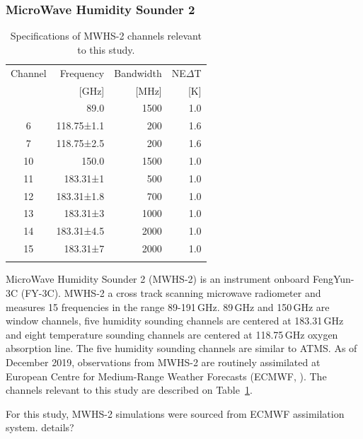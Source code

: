 \documentclass[amt, manuscript]{copernicus}
\newcommand{\todo}[1]{{\color{red} #1}}
\begin{document}
\subsubsection{ MicroWave Humidity Sounder 2}
%
\begin{table}[t]
	\caption{Specifications of MWHS-2 channels relevant to this study.}
	\label{tab:specifications_MWHS2}	
	\begin{tabular}{crrr}
		\tophline
		Channel & Frequency 	& Bandwidth & NE$\Delta$T \\
		& [GHz]			& [MHz]		& [K]		\\
		\middlehline
		1	&	89.0   		  & 1500			&	1.0	\\
		6	&	118.75±1.1    & \phantom{0}200 	&	1.6\\
		7	&	118.75±2.5    & \phantom{0}200 	&	1.6\\
		10	&	150.0         & 1500 			&	1.0 \\
		11	&	183.31±1      & \phantom{0}500  &	1.0 \\
		12  & 	183.31±1.8    & \phantom{0}700 	&   1.0\\
		13  & 	183.31±3      & 1000    		&	1.0	\\
		14  & 	183.31±4.5    & 2000    		&	1.0\\
		15  & 	183.31±7      & 2000  			&	1.0  \\
		\bottomhline
	\end{tabular}
	\belowtable{} %
\end{table}
MicroWave Humidity Sounder 2 (MWHS-2) is an instrument onboard FengYun-3C (FY-3C). MWHS-2 a cross track scanning microwave radiometer and measures 15 frequencies in the range 89-191\,GHz. 89\,GHz and 150\,GHz are window channels, five humidity sounding channels are centered at 183.31\,GHz and eight temperature sounding channels are centered at 118.75\,GHz oxygen absorption line. The five humidity sounding channels are similar to ATMS. As of December 2019, observations from MWHS-2 are routinely assimilated at European Centre for Medium-Range Weather Forecasts (ECMWF, \citet{duncan2020MWHS}). The channels relevant to this study are described on Table~\ref{tab:specifications_MWHS2}. 

For this study, MWHS-2 simulations were sourced from ECMWF assimilation system. \todo{details?}
\end{document}
